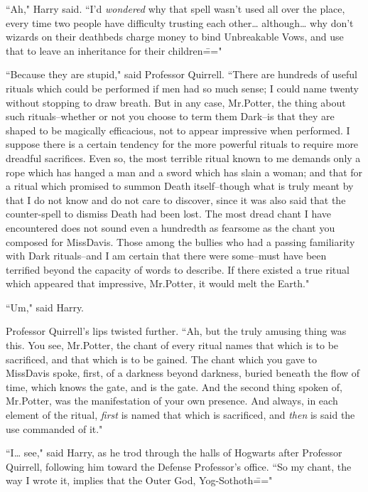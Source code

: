 ``Ah," Harry said. ``I'd \emph{wondered} why that spell wasn't used all over the place, every time two people have difficulty trusting each other{\ldots} although{\ldots} why don't wizards on their deathbeds charge money to bind Unbreakable Vows, and use that to leave an inheritance for their children\==="

``Because they are stupid," said Professor Quirrell. ``There are hundreds of useful rituals which could be performed if men had so much sense; I could name twenty without stopping to draw breath. But in any case, Mr.\?Potter, the thing about such rituals\---whether or not you choose to term them Dark\---is that they are shaped to be magically efficacious, not to appear impressive when performed. I suppose there is a certain tendency for the more powerful rituals to require more dreadful sacrifices. Even so, the most terrible ritual known to me demands only a rope which has hanged a man and a sword which has slain a woman; and that for a ritual which promised to summon Death itself\---though what is truly meant by that I do not know and do not care to discover, since it was also said that the counter-spell to dismiss Death had been lost. The most dread chant I have encountered does not sound even a hundredth as fearsome as the chant you composed for Miss\?Davis. Those among the bullies who had a passing familiarity with Dark rituals\---and I am certain that there were some\---must have been terrified beyond the capacity of words to describe. If there existed a true ritual which appeared that impressive, Mr.\?Potter, it would melt the Earth."

``Um," said Harry.

Professor Quirrell's lips twisted further. ``Ah, but the truly amusing thing was this. You see, Mr.\?Potter, the chant of every ritual names that which is to be sacrificed, and that which is to be gained. The chant which you gave to Miss\?Davis spoke, first, of a darkness beyond darkness, buried beneath the flow of time, which knows the gate, and is the gate. And the second thing spoken of, Mr.\?Potter, was the manifestation of your own presence. And always, in each element of the ritual, \emph{first} is named that which is sacrificed, and \emph{then} is said the use commanded of it."

``I{\ldots} see," said Harry, as he trod through the halls of Hogwarts after Professor Quirrell, following him toward the Defense Professor's office. ``So my chant, the way I wrote it, implies that the Outer God, Yog-Sothoth\==="

